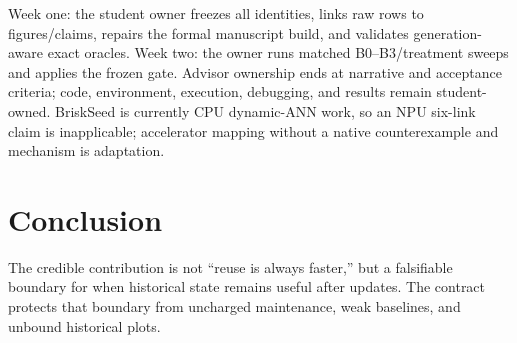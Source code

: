 \documentclass[10pt]{article}
\begin{document}
Week one: the student owner freezes all identities, links raw rows to figures/claims, repairs the formal manuscript build, and validates generation-aware exact oracles. Week two: the owner runs matched B0--B3/treatment sweeps and applies the frozen gate.  Advisor ownership ends at narrative and acceptance criteria; code, environment, execution, debugging, and results remain student-owned.  BriskSeed is currently CPU dynamic-ANN work, so an NPU six-link claim is inapplicable; accelerator mapping without a native counterexample and mechanism is adaptation.

\section{Conclusion}
The credible contribution is not ``reuse is always faster,'' but a falsifiable boundary for when historical state remains useful after updates.  The contract protects that boundary from uncharged maintenance, weak baselines, and unbound historical plots.

\end{document}
